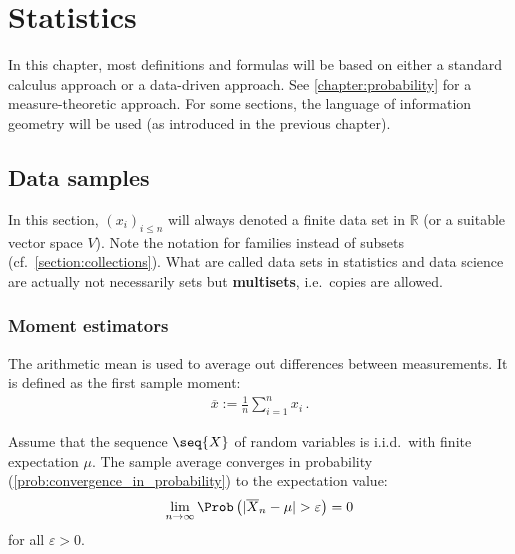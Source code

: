 \chapter{Statistics}\label{chapter:statistics}

    In this chapter, most definitions and formulas will be based on either a standard calculus approach or a data-driven approach. See \cref{chapter:probability} for a measure-theoretic approach. For some sections, the language of information geometry will be used (as introduced in the previous chapter).

    \minitoc

\section{Data samples}

    In this section, $(x_i)_{i\leq n}$ will always denoted a finite data set in $\mathbb{R}$ (or a suitable vector space $V$). Note the notation for families instead of subsets (cf.~\cref{section:collections}). What are called data sets in statistics and data science are actually not necessarily sets but \textbf{multisets}, i.e.~copies are allowed.

\subsection{Moment estimators}

    \begin{example}\label{statistics:arithmetic_mean}
        The arithmetic mean is used to average out differences between measurements. It is defined as the first sample moment:
        \begin{gather}
            \overline{x} := \frac{1}{n}\sum_{i=1}^nx_i\,.
        \end{gather}
    \end{example}

    \begin{theorem}
        Assume that the sequence $\seq{X}$ of random variables is i.i.d.~with finite expectation $\mu$. The sample average converges in probability (\cref{prob:convergence_in_probability}) to the expectation value:
        \begin{gather}
            \lim_{n\rightarrow\infty}\Prob\left(|\overline{X}_n-\mu|>\varepsilon\right)=0
        \end{gather}
        for all $\varepsilon>0$.
    \end{theorem}

